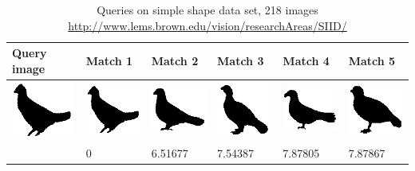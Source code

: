 \documentclass[10pt,a4paper]{article}
\begin{document}
\begin{table}
    \caption{Queries on simple shape data set, 218 images \url{http://www.lems.brown.edu/vision/researchAreas/SIID/}}
    \begin{tabular}{|l|l|l|l|l|l|}
        \hline
        Query image & Match 1 & Match 2 & Match 3 & Match 4 & Match 5 \\ \hline

        \includegraphics[width=20mm]{queries/bird09.png} &	
	\includegraphics[width=20mm]{queries/bird09.png}  & 
	\includegraphics[width=20mm]{queries/bird18.png}  &
	\includegraphics[width=20mm]{queries/bird07.png}  &
	\includegraphics[width=20mm]{queries/bird19.png} &
	\includegraphics[width=20mm]{queries/bird02.png} \\ 
	~ & 0 & 6.51677 & 7.54387 &  7.87805 & 7.87867 \\ \hline


\end{tabular}
\end{table}
\end{document}

